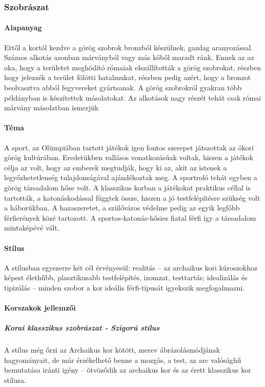 \subsubsection{Szobrászat}

\paragraph{Alapanyag}
Ettől a kortól kezdve a görög szobrok bronzból készülnek, gazdag aranyozással. Számos alkotás azonban márványból vagy más kőből maradt ránk. Ennek az az oka, hogy a területet meghódító rómaiak elszállították a görög szobrokat, részben hogy jelezzék a terület fölötti hatalmukat, részben pedig azért, hogy a bronzot beolvasztva abból fegyvereket gyártsanak. A görög szobrokról gyakran több példányban is készítettek másolatokat. Az alkotások nagy részét tehát csak római márvány másolatban ismerjük

\paragraph{Téma}
A sport, az Olümpiában tartott játékok igen fontos szerepet játszottak az ókori görög kultúrában. Eredetükben vallásos vonatkozásúak voltak, hiszen a játékok célja az volt, hogy az emberek megtudják, hogy ki az, akit az istenek a legyőzhetetlenség tulajdonságával ajándékoztak meg. A sportroló tehát egyben a görög társadalom hőse volt. A klasszikus korban a játékokat praktikus céllal is tartották, a katonáskodással függtek össze, hiszen a jó testfelépítésre szükség volt a háborúkban. A hazaszeretet, a szülőváros védelme pedig az egyik legfőbb férfierények közé tartozott. A sportos-katonás-hősies fiatal férfi így a társadalom mintaképévé vált.

\paragraph{Stílus}
A stílusban egyszerre két cél érvényesül: realitás – az archaikus kori kúroszokhoz képest élethűbb, plasztikusabb testfelépítés, izomzat, testtartás; idealizálás és tipizálás – minden szobor a kor ideális férfi-típusát igyekszik megfogalmazni.

\paragraph{Korszakok jellemzői}

	\subparagraph{Korai klasszikus szobrászat - Szigorú stílus}
	A stílus még őrzi az Archaikus kor kötött, merev ábrázolásmódjának hagyományait, de már érzékelhető benne a mozgás, a test, az arc valósághű bemutatása iránti igény – ötvöződik az archaikus kor és az érett klasszikus kor stílusa.
	
